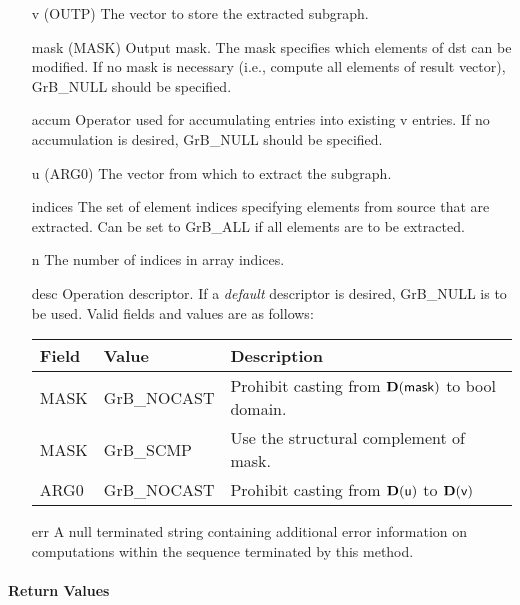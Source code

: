 \begin{itemize}[leftmargin=1in]
    \item[{\sf v}]   ({\sf OUTP}) The vector to store the extracted subgraph.

    \item[{\sf mask}] ({\sf MASK}) Output mask. The mask
    specifies which elements of {\sf dst} can be modified.
    If no mask is necessary (i.e., compute all elements of result
    vector), {\sf GrB\_NULL} should be specified.

    \item[{\sf accum}]  Operator used for accumulating entries into existing {\sf v} entries. 
			If no accumulation is desired, {\sf GrB\_NULL} should be specified.

    \item[{\sf u}]   ({\sf ARG0}) The vector from which to extract the subgraph.
    \item[{\sf indices}]     The set of element indices specifying elements from source that
                              are extracted. Can
                              be set to {\sf GrB\_ALL} if all elements are
                              to be extracted.
    \item[{\sf n}]     The number of indices in array {\sf indices}.

    \item[{\sf desc}]   Operation descriptor. If a
    \emph{default} descriptor is desired, {\sf GrB\_NULL} is to be
    used.  Valid fields and values are as follows: \\
    \begin{tabular}{lll}
    Field  & Value & Description \\
    \hline
    {\sf MASK} & {\sf GrB\_NOCAST} & Prohibit casting from $\bold{D}({\sf mask})$ to {\sf bool} domain. \\
    {\sf MASK} & {\sf GrB\_SCMP}   & Use the structural complement of {\sf mask}. \\
    {\sf ARG0} & {\sf GrB\_NOCAST} & Prohibit casting from $\bold{D}({\sf u})$ to $\bold{D}({\sf v})$ \\
    \end{tabular}
    \item[{\sf err}]     A null terminated string containing additional error
                         information on computations within the sequence 
                         terminated by this method. 
\end{itemize}

\paragraph{Return Values}

